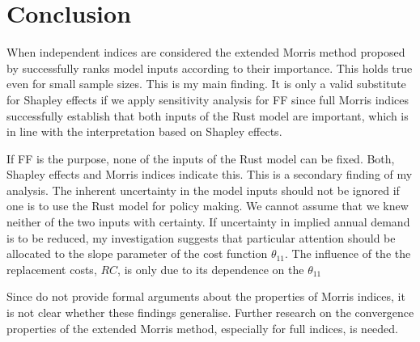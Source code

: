 \section{Conclusion} \label{conclusion}



When independent indices are considered the extended Morris method proposed by \citet{GM17} successfully ranks model inputs according to their importance. This holds true even for small sample sizes. This is my main finding. It is only a valid substitute for Shapley effects if we apply sensitivity analysis for FF since full Morris indices successfully establish that both inputs of the Rust model are important, which is in line with the interpretation based on Shapley effects. %

If FF is the purpose, none of the inputs of the Rust model can be fixed. Both, Shapley effects and Morris indices indicate this. This is a secondary finding of my analysis. The inherent uncertainty in the model inputs should not be ignored if one is to use the Rust model for policy making. We cannot assume that we knew neither of the two inputs with certainty. If uncertainty in implied annual demand is to be reduced, my investigation suggests that particular attention should be allocated to the slope parameter of the cost function $\theta_{11}$. The influence of the the replacement costs, $RC$, is only due to its dependence on the $\theta_{11}$


Since \citet{GM17} do not provide formal arguments about the properties of Morris indices, it is not clear whether these findings generalise. Further research on the convergence properties of the extended Morris method, especially for full indices, is needed.

